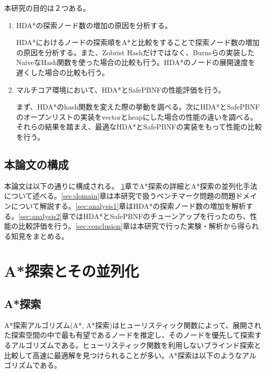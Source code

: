 \documentclass{jsarticle}
\begin{document}
本研究の目的は２つある。

\begin{enumerate}
\item HDA*の探索ノード数の増加の原因を分析する。
\newline

HDA*におけるノードの探索順をA*と比較をすることで探索ノード数の増加の原因を分析する。また、Zobrist Hashだけではなく、Burnsらの実装したNaiveなHash関数を使った場合の比較も行う。HDA*のノードの展開速度を遅くした場合の比較も行う。
\newline

\item マルチコア環境において、HDA*とSafePBNFの性能評価を行う。
\newline

まず、HDA*のhash関数を変えた際の挙動を調べる。次にHDA*とSafePBNFのオープンリストの実装をvectorとheapにした場合の性能の違いを調べる。それらの結果を踏まえ、最適なHDA*とSafePBNFの実装をもって性能の比較を行う。

\end{enumerate}


\subsection{本論文の構成}

本論文は以下の通りに構成される。
\ref{sec:define}章でA*探索の詳細とA*探索の並列化手法について述べる。\ref{sec:domain}章は本研究で扱うベンチマーク問題の問題ドメインについて解説する。\ref{sec:analysis1}章はHDA*の探索ノード数の増加を解析する。\ref{sec:analysis2}章ではHDA*とSafePBNFのチューンアップを行ったのち、性能の比較評価を行う。\ref{sec:conclusion}章は本研究で行った実験・解析から得られる知見をまとめる。

\section{A*探索とその並列化}
\label{sec:define}
\subsection{A*探索}

A*探索アルゴリズム(A*, A*探索)はヒューリスティック関数によって、展開された探索空間の中で最も有望であるノードを推定し、そのノードを優先して探索するアルゴリズムである\cite{Hart1968}。ヒューリスティック関数を利用しないブラインド探索と比較して高速に最適解を見つけられることが多い。A*探索は以下のようなアルゴリズムである。
\end{document}
